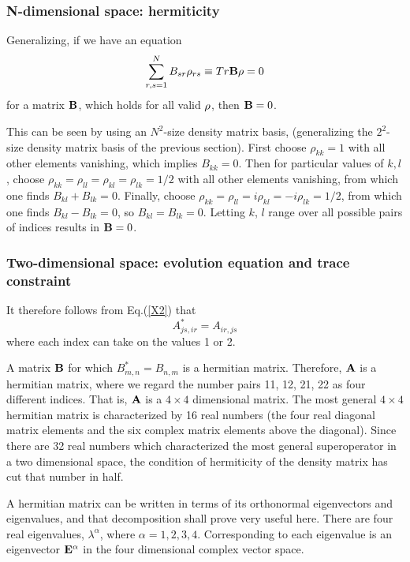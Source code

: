 \documentclass[aps,pra,amssymb, amsfonts,amsmath,showpacs, superscriptaddress,12pt]{revtex4}
\begin{document}
\subsubsection{N-dimensional space: hermiticity}

 Generalizing, if we have an equation  
\begin{equation}\label{X3}
\sum_{r,s=1}^{N}B_{sr}\rho_{rs}\equiv Tr{\bf B\rho}=0
\end{equation}
\noindent  for a matrix ${\bf B}$, which holds for all valid ${\bf\rho}$, then ${\bf B}=0$.  


This can be seen by using an $N^{2}$-size density matrix  basis,  (generalizing the $2^{2}$-size density matrix basis of the previous section).  First choose $\rho_{kk}=1$ with all other elements vanishing,   which implies $B_{kk}=0$. Then  for particular values of $k,l$, choose $\rho_{kk}=\rho_{ll}=\rho_{kl}=\rho_{lk}=1/2$ with all other elements vanishing, from which one finds $B_{kl}+B_{lk}=0$. Finally,  choose $\rho_{kk}=\rho_{ll}=i\rho_{kl}=-i\rho_{lk}=1/2$,  from which one  finds $B_{kl}-B_{lk}=0$,   so $B_{kl}=B_{lk}=0$.  Letting $k$, $l$ range over all possible pairs of indices results in ${\bf B}=0$. 

\subsubsection{Two-dimensional space: evolution equation and trace constraint}

It therefore follows from Eq.(\ref{X2}) that 
\[
A_{js,ir}^{*}=A_{ir,js}
\]
\noindent where each index can take on the values 1 or 2. 

A matrix ${\bf B}$ for which $B_{m, n}^{*}=B_{n, m}$ is a hermitian matrix.  Therefore, ${\bf A}$ is a hermitian matrix, where we regard the number pairs  11, 12, 21, 22  as 
four different indices.  That is,  ${\bf A}$ is a $4\times4$ dimensional matrix.  The most general $4\times4$ hermitian  matrix is characterized by 16 real numbers (the four real diagonal matrix elements and the six complex matrix elements above the diagonal).  Since there are 32 real numbers which characterized the most general superoperator in a two dimensional space, the condition of hermiticity of the density matrix has cut that number in half.  

A hermitian matrix can be written in terms of its orthonormal eigenvectors and eigenvalues, and that decomposition shall prove very useful here.  There are four real eigenvalues, 
$\lambda^{\alpha}$, where $\alpha =1, 2, 3, 4$.  Corresponding to each eigenvalue is an eigenvector ${\bf E}^{\alpha}$ in the four dimensional complex vector space.  
\end{document}
